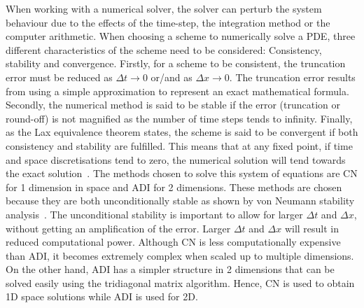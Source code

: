 When working with a numerical solver, the solver can perturb the system behaviour due to the effects of the time-step, the integration method or the computer arithmetic.
When choosing a scheme to numerically solve a PDE, three different characteristics of the scheme need to be considered: Consistency, stability and convergence.
Firstly, for a scheme to be consistent, the truncation error must be reduced as $\Delta t \rightarrow 0$ or/and as $\Delta x \rightarrow 0$.
The truncation error results from using a simple approximation to represent an exact mathematical formula.
Secondly, the numerical method is said to be stable if the error (truncation or round-off) is not magnified as the number of time steps tends to infinity.
Finally, as the Lax equivalence theorem states, the scheme is said to be convergent if both consistency and stability are fulfilled.
This means that at any fixed point, if time and space discretisations tend to zero, the numerical solution will tend towards the exact solution~\parencite{smith1985numerical}.
The methods chosen to solve this system of equations are \acrfull{CN} for 1 dimension in space and \acrfull{ADI} for 2 dimensions. These methods are chosen because they are both unconditionally stable as shown by von Neumann stability analysis~\parencite{strikwerda2004finite}. The unconditional stability is important to allow for larger $\Delta t$ and $\Delta x$, without getting an amplification of the error. Larger $\Delta t$ and $\Delta x$ will result in reduced computational power. Although \acrshort{CN} is less computationally expensive than \acrshort{ADI}, it becomes extremely complex when scaled up to multiple dimensions. On the other hand, \acrshort{ADI} has a simpler structure in 2 dimensions that can be solved easily using the tridiagonal matrix algorithm. Hence, \acrshort{CN} is used to obtain 1D space solutions while \acrshort{ADI} is used for 2D.
